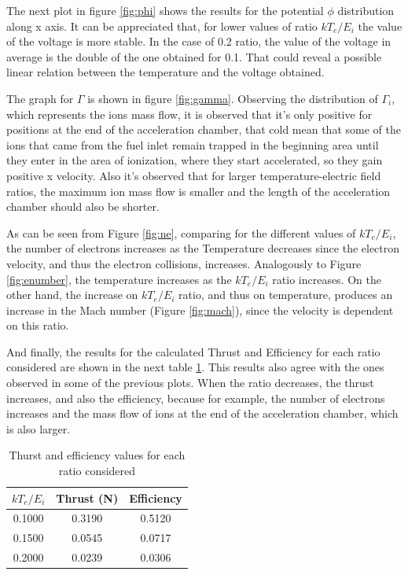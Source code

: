 The next plot in figure \ref{fig:phi} shows the results for the potential $\phi$
distribution along x axis.
It can be appreciated that, for lower values of ratio $kT_e/E_i$ the value of the
voltage is more stable. In the case of 0.2 ratio, the value of the voltage in
average is the double of the one obtained for 0.1. That could reveal a possible
linear relation between the temperature and the voltage obtained.

The graph for $\Gamma$ is shown in figure \ref{fig:gamma}.
Observing the distribution of $\Gamma_i$, which represents the ions mass flow,
it is observed that it's only positive for positions at the end of the acceleration
chamber, that cold mean that some of the ions that came from the fuel inlet remain trapped
in the beginning area until they enter in the area of ionization, where they start
accelerated, so they gain positive x velocity. Also it's observed that for larger
temperature-electric field ratios, the maximum ion mass flow is smaller and the
length of the acceleration chamber should also be shorter.

As can be seen from Figure \ref{fig:ne}, comparing for the different values of
$kT_e/E_i$, the number of electrons increases as the Temperature decreases since
the electron velocity, and thus the electron collisions, increases. Analogously
to Figure \ref{fig:enumber}, the temperature increases as the $kT_e/E_i$ ratio
increases. On the other hand, the increase on $kT_e/E_i$ ratio, and thus on temperature,
produces an increase in the Mach number (Figure \ref{fig:mach}), since the velocity
is dependent on this ratio.

And finally, the results for the calculated Thrust and Efficiency for each ratio
considered are shown in the next table \ref{tab:results}. This results also agree with
the ones observed in some of the previous plots. When the ratio decreases, the
thrust increases, and also the efficiency, because for example, the number of
electrons increases and the mass flow of ions at the end of the acceleration chamber,
which is also larger.

\begin{table}[]
\centering
\begin{tabular}{ccc}
$kT_e/E_i$ & Thrust (N) & Efficiency \\ \hline
0.1000 & 0.3190 & 0.5120 \\ \hline
0.1500 & 0.0545 & 0.0717 \\ \hline
0.2000 & 0.0239 & 0.0306 \\ \hline
\end{tabular}
\caption{Thurst and efficiency values for each ratio considered}
\label{tab:results}
\end{table}


